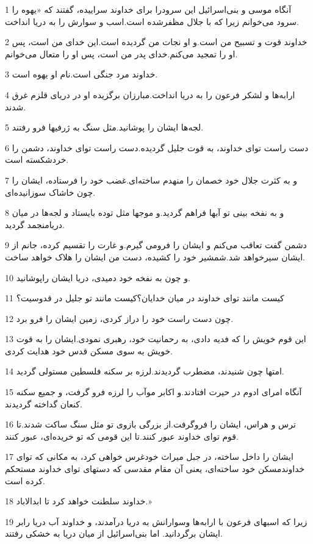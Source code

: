 \par 1 آنگاه موسی و بنی‌اسرائیل این سرودرا برای خداوند سراییده، گفتند که «یهوه را سرود می‌خوانم زیرا که با جلال مظفرشده است.اسب و سوارش را به دریا انداخت.
\par 2 خداوند قوت و تسبیح من است.و او نجات من گردیده است.این خدای من است، پس او را تمجید می‌کنم.خدای پدر من است، پس او را متعال می‌خوانم.
\par 3 خداوند مرد جنگی است.نام او یهوه است.
\par 4 ارابه‌ها و لشکر فرعون را به دریا انداخت.مبارزان برگزیده او در دریای قلزم غرق شدند.
\par 5 لجه‌ها ایشان را پوشانید.مثل سنگ به ژرفیها فرو رفتند.
\par 6 دست راست تو‌ای خداوند، به قوت جلیل گردیده.دست راست تو‌ای خداوند، دشمن را خردشکسته است.
\par 7 و به کثرت جلال خود خصمان را منهدم ساخته‌ای.غضب خود را فرستاده، ایشان را چون خاشاک سوزانیده‌ای.
\par 8 و به نفخه بینی تو آبها فراهم گردید.و موجها مثل توده بایستاد و لجه‌ها در میان دریامنجمد گردید.
\par 9 دشمن گفت تعاقب می‌کنم و ایشان را فرومی گیرم.و غارت را تقسیم کرده، جانم از ایشان سیرخواهد شد.شمشیر خود را کشیده، دست من ایشان را هلاک خواهد ساخت.
\par 10 و چون به نفخه خود دمیدی، دریا ایشان راپوشانید.
\par 11 کیست مانند تو‌ای خداوند در میان خدایان؟کیست مانند تو جلیل در قدوسیت؟
\par 12 چون دست راست خود را دراز کردی، زمین ایشان را فرو برد.
\par 13 این قوم خویش را که فدیه دادی، به رحمانیت خود، رهبری نمودی.ایشان را به قوت خویش به سوی مسکن قدس خود هدایت کردی.
\par 14 امتها چون شنیدند، مضطرب گردیدند.لرزه بر سکنه فلسطین مستولی گردید.
\par 15 آنگاه امرای ادوم در حیرت افتادند.و اکابر موآب را لرزه فرو گرفت، و جمیع سکنه کنعان گداخته گردیدند.
\par 16 ترس و هراس، ایشان را فروگرفت.از بزرگی بازوی تو مثل سنگ ساکت شدند.تا قوم تو‌ای خداوند عبور کنند.تا این قومی که تو خریده‌ای، عبور کنند.
\par 17 ایشان را داخل ساخته، در جبل میراث خودغرس خواهی کرد، به مکانی که تو‌ای خداوندمسکن خود ساخته‌ای، یعنی آن مقام مقدسی که دستهای تو‌ای خداوند مستحکم کرده است.
\par 18 خداوند سلطنت خواهد کرد تا ابدالاباد.»
\par 19 زیرا که اسبهای فرعون با ارابه‌ها وسوارانش به دریا درآمدند، و خداوند آب دریا رابر ایشان برگردانید. اما بنی‌اسرائیل از میان دریا به خشکی رفتند.
